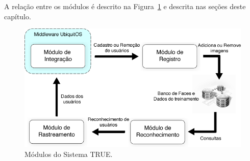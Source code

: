 A relação entre os módulos é descrito na Figura~\ref{fig:relacao-modulos} e descrita nas seções deste capítulo.

	\begin{figure}[hbt]
			\begin{center}
				\includegraphics[scale=0.5]{figuras/4.ProblemaEProposta/modulo-integracao.png}
			\end{center}
			\caption{Módulos do Sistema TRUE.}
			\label{fig:relacao-modulos}
		\end{figure}







